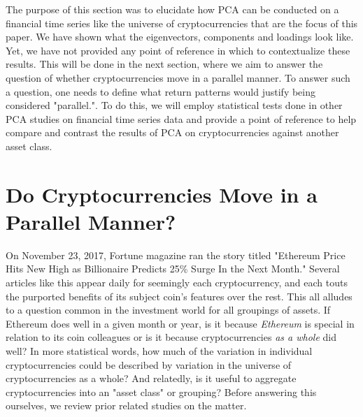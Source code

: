 \documentclass[12pt,twoside]{article}
\begin{document}
The purpose of this section was to elucidate how PCA can be conducted on a financial time series like the universe of cryptocurrencies that are the focus of this paper. We have shown what the eigenvectors, components and loadings look like. Yet, we have not provided any point of reference in which to contextualize these results. This will be done in the next section, where we aim to answer the question of whether cryptocurrencies move in a parallel manner. To answer such a question, one needs to define what return patterns would justify being considered "parallel.". To do this, we will employ statistical tests done in other PCA studies on financial time series data and provide a point of reference to help compare and contrast the results of PCA on cryptocurrencies against another asset class.

\section{Do Cryptocurrencies Move in a Parallel Manner?}

On November 23, 2017, Fortune magazine ran the story titled "Ethereum Price Hits New High as Billionaire Predicts 25\% Surge In the Next Month." Several articles like this appear daily for seemingly each cryptocurrency, and each touts the purported benefits of its subject coin's features over the rest. This all alludes to a question common in the investment world for all groupings of assets. If Ethereum does well in a given month or year, is it because \textit{Ethereum} is special in relation to its coin colleagues or is it because cryptocurrencies \textit{as a whole} did well? In more statistical words, how much of the variation in individual cryptocurrencies could be described by variation in the universe of cryptocurrencies as a whole? And relatedly, is it useful to aggregate cryptocurrencies into an "asset class" or grouping? Before answering this ourselves, we review prior related studies on the matter.
\end{document}
